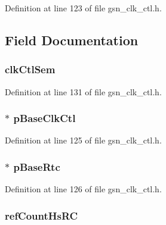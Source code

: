 Definition at line 123 of file gsn\_\-clk\_\-ctl.h.



\subsection{Field Documentation}
\hypertarget{a00039_a8f4222b161f244e325365d98301fd760}{
\subsubsection[{clkCtlSem}]{ {\bf clkCtlSem}}}
\label{a00039_a8f4222b161f244e325365d98301fd760}


Definition at line 131 of file gsn\_\-clk\_\-ctl.h.

\hypertarget{a00039_a4d9db25bd3b3c581127abb8a496b7cdc}{
\subsubsection[{pBaseClkCtl}]{$\ast$ {\bf pBaseClkCtl}}}
\label{a00039_a4d9db25bd3b3c581127abb8a496b7cdc}


Definition at line 125 of file gsn\_\-clk\_\-ctl.h.

\hypertarget{a00039_a0ce3025a2f8b06c8b5338d0c04c16fa2}{
\subsubsection[{pBaseRtc}]{$\ast$ {\bf pBaseRtc}}}
\label{a00039_a0ce3025a2f8b06c8b5338d0c04c16fa2}


Definition at line 126 of file gsn\_\-clk\_\-ctl.h.

\hypertarget{a00039_afef2b349725cb1d892034d5329f37353}{
\subsubsection[{refCountHsRC}]{ {\bf refCountHsRC}}}
\label{a00039_afef2b349725cb1d892034d5329f37353}



